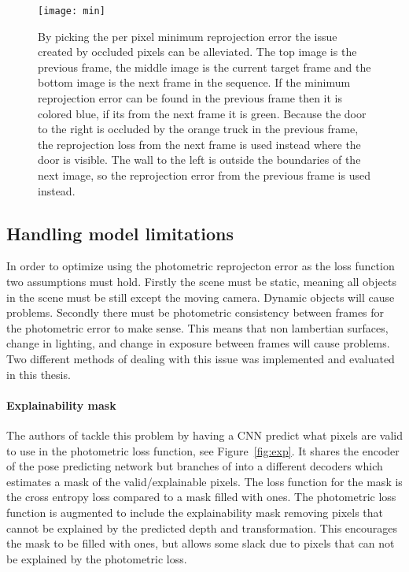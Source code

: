 \begin{figure}[H]
	\centering
	\texttt{[image: min]}
	\caption{By picking the per pixel minimum reprojection error the issue created by occluded pixels can be alleviated. The top image is the previous frame, the middle image is the current target frame and the bottom image is the next frame in the sequence. If the minimum reprojection error can be found in the previous frame then it is colored blue, if its from the next frame it is green. Because the door to the right is occluded by the orange truck in the previous frame, the reprojection loss from the next frame is used instead where the door is visible. The wall to the left is outside the boundaries of the next image, so the reprojection error from the previous frame is used instead.}
	\label{fig:min}
\end{figure}

\subsection{Handling model limitations}
\label{sec:modellimit}

In order to optimize using the photometric reprojecton error as the loss function two assumptions must hold. Firstly the scene must be static, meaning all objects in the scene must be still except the moving camera. Dynamic objects will cause problems. Secondly there must be photometric consistency between frames for the photometric error to make sense. This means that non lambertian surfaces, change in lighting, and change in exposure between frames will cause problems. Two different methods of dealing with this issue was implemented and evaluated in this thesis.

\paragraph{Explainability mask} The authors of \cite{sfmlearner} tackle this problem by having a CNN predict what pixels are valid to use in the photometric loss function, see Figure~\ref{fig:exp}. It shares the encoder of the pose predicting network but branches of into a different decoders which estimates a mask of the valid/explainable pixels. The loss function for the mask is the cross entropy loss compared to a mask filled with ones. The photometric loss function is augmented to include the explainability mask removing pixels that cannot be explained by the predicted depth and transformation. This encourages the mask to be filled with ones, but allows some slack due to pixels that can not be explained by the photometric loss.

